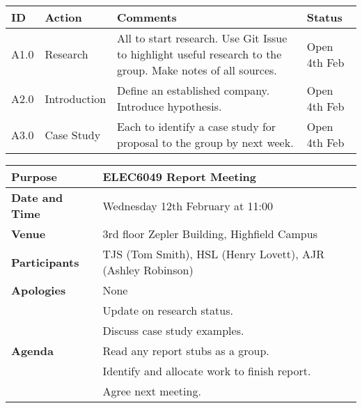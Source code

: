 \begin{center}
\begin{longtable}{| p{} | >{\raggedright\arraybackslash}p{} |  p{} | >{\raggedright\arraybackslash}p{}|} \hline
\textbf{ID} & \textbf{Action} & \textbf{Comments} & \textbf{Status} \\ \hline
\endhead
A1.0	&	Research	&	All to start research. Use Git Issue to highlight useful research to the group. Make notes of all sources.	& Open 4th Feb \\ \hline
A2.0	&	Introduction	&	Define an established company. Introduce hypothesis.	&	Open 4th Feb \\ \hline
A3.0	&	Case Study	&	Each to identify a case study for proposal to the group by next week.	&	Open 4th Feb	\\ \hline	
\end{longtable}
\end{center}



\begin{center}
\begin{longtable}{| m{} | m{} |} \hline
\textbf{Purpose} & ELEC6049 Report Meeting \\ \hline
\textbf{Date and Time} & Wednesday 12th February at 11:00 \\ \hline
\textbf{Venue} & 3rd floor Zepler Building, Highfield Campus \\ \hline
\textbf{Participants} & TJS (Tom Smith), HSL (Henry Lovett), AJR (Ashley Robinson)\\ \hline
\textbf{Apologies} & None \\ \hline
\multirow{5}{*}{\textbf{Agenda}} & Update on research status. \\
 & Discuss case study examples. \\ 
 & Read any report stubs as a group. \\
 & Identify and allocate work to finish report. \\ 
 & Agree next meeting. \\ \hline
\end{longtable}
\end{center}

